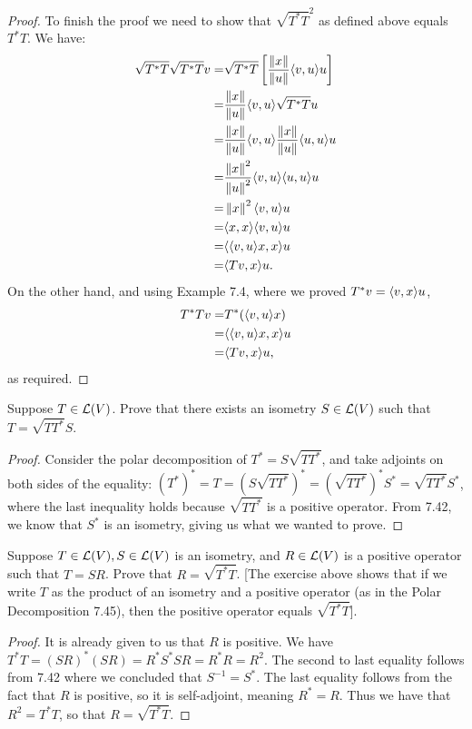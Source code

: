 \begin{proof}
 To finish the proof we need to show that $\sqrt{T^\ast T}^2$ as defined above equals $T^\ast T$. We have:
 \begin{align*}
     \sqrt{T^\ast T}\sqrt{T^\ast T}v =& \sqrt{T^\ast T}\left[\frac{\left\lVert x\right\rVert}{\left\lVert u\right\rVert}\langle v,u\rangle u\right]\\
     =& \frac{\left\lVert x\right\rVert}{\left\lVert u\right\rVert}\langle v,u\rangle\sqrt{T^\ast T}u\\
     =& \frac{\left\lVert x\right\rVert}{\left\lVert u\right\rVert}\langle v,u\rangle\frac{\left\lVert x\right\rVert}{\left\lVert u\right\rVert}\langle u,u\rangle u\\
     =& \frac{\left\lVert x\right\rVert^2}{\left\lVert u\right\rVert^2}\langle v,u\rangle\langle u,u\rangle u\\
     =& \left\lVert x\right\rVert^2\langle v,u\rangle u\\
     =& \langle x,x\rangle\langle v,u\rangle u\\
     =& \langle \langle v,u\rangle x,x\rangle u\\
     =& \langle Tv,x\rangle u.
 \end{align*}
 On the other hand, and using Example 7.4, where we proved $T^\ast v=\langle v,x\rangle u$,
 \begin{align*}
     T^\ast Tv =& T^\ast(\langle v,u\rangle x)\\
     =& \langle \langle v,u\rangle x,x\rangle u\\
     =& \langle Tv,x\rangle u,
 \end{align*}
 as required.
\end{proof}

\begin{exercise}{3}
  Suppose $T\in\mathcal{L}(V)$. Prove that there exists an isometry $S\in\mathcal{L}(V)$ such that $T =\sqrt{TT^\ast}S$.
\end{exercise}
\begin{proof}
 Consider the polar decomposition of $T^\ast=S\sqrt{TT^\ast}$, and take adjoints on both sides of the equality: $(T^\ast)^\ast = T =(S\sqrt{TT^\ast})^\ast =(\sqrt{TT^\ast})^\ast S^\ast =\sqrt{TT^\ast}S^\ast$, where the last inequality holds because $\sqrt{TT^\ast}$ is a positive operator. From 7.42, we know that $S^\ast$ is an isometry, giving us what we wanted to prove.
\end{proof}

\begin{exercise}{8}
  Suppose $T\in\mathcal{L}(V),S\in\mathcal{L}(V)$ is an isometry, and $R\in\mathcal{L}(V)$ is a positive operator such that $T=SR$. Prove that $R =\sqrt{T^\ast T}$. [The exercise above shows that if we write $T$ as the product of an isometry and a positive operator (as in the Polar Decomposition 7.45), then the positive operator equals $\sqrt{T^\ast T}$].
\end{exercise}
\begin{proof}
 It is already given to us that $R$ is positive. We have $T^\ast T =(SR)^\ast (SR) =R^\ast S^\ast S R =R^\ast R =R^2$. The second to last equality follows from 7.42 where we concluded that $S^{-1} =S^\ast$. The last equality follows from the fact that $R$ is positive, so it is self-adjoint, meaning $R^\ast = R$. Thus we have that $R^2 =T^\ast T$, so that $R =\sqrt{T^\ast T}$.
\end{proof}

